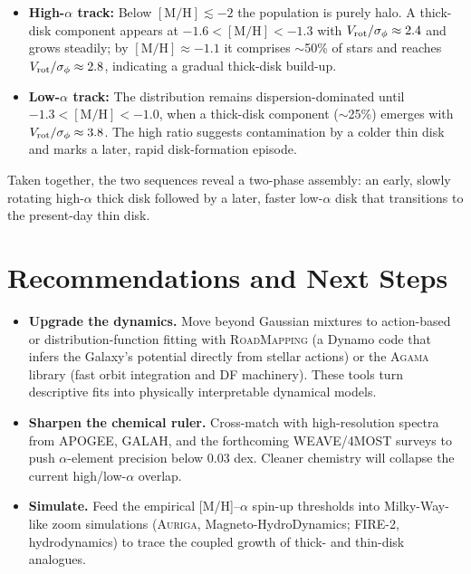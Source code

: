 \documentclass[a4paper,10pt]{article}
\begin{document}
\begin{multicols}{2}
\begin{itemize}
  \item \textbf{High-$\alpha$ track:} Below $\mathrm{[M/H]}\lesssim -2$ the population is purely halo.  
        A thick-disk component appears at $-1.6 < [\mathrm{M/H}] < -1.3$ with 
        $V_{\rm rot}/\sigma_\phi \approx 2.4$ and grows steadily; by 
        $[\mathrm{M/H}]\approx -1.1$ it comprises $\sim$50\% of stars and 
        reaches $V_{\rm rot}/\sigma_\phi \approx 2.8$, indicating a gradual 
        thick-disk build-up.
  \item \textbf{Low-$\alpha$ track:} The distribution remains dispersion-dominated 
        until $-1.3 < [\mathrm{M/H}] < -1.0$, when a thick-disk component 
        ($\sim$25\%) emerges with $V_{\rm rot}/\sigma_\phi \approx 3.8$.  
        The high ratio suggests contamination by a colder thin disk and marks a 
        later, rapid disk-formation episode.
\end{itemize}

Taken together, the two sequences reveal a two-phase assembly: an early, 
slowly rotating high-$\alpha$ thick disk followed by a later, faster low-$\alpha$ 
disk that transitions to the present-day thin disk.


\section*{Recommendations and Next Steps}

\begin{itemize}
  \item \textbf{Upgrade the dynamics.}  Move beyond Gaussian mixtures to
        action-based or distribution-function fitting with
        \textsc{RoadMapping} (a Dynamo code that infers the Galaxy's potential
        directly from stellar actions) or the \textsc{Agama} library
        (fast orbit integration and DF machinery).  These tools turn descriptive fits into
        physically interpretable dynamical models.

  \item \textbf{Sharpen the chemical ruler.}  Cross-match with high-resolution
        spectra from APOGEE, GALAH, and the forthcoming WEAVE/4MOST surveys to
        push $\alpha$-element precision below 0.03 dex.  Cleaner chemistry will
        collapse the current high/low-$\alpha$ overlap.


  \item \textbf{Simulate.}  
        Feed the empirical [M/H]–$\alpha$ spin-up thresholds into Milky-Way-like zoom simulations
        (\textsc{Auriga}, Magneto-HydroDynamics; \textsc{FIRE-2}, hydrodynamics) to trace the coupled growth of thick- and thin-disk analogues.


\end{itemize}
\end{multicols}
\end{document}
